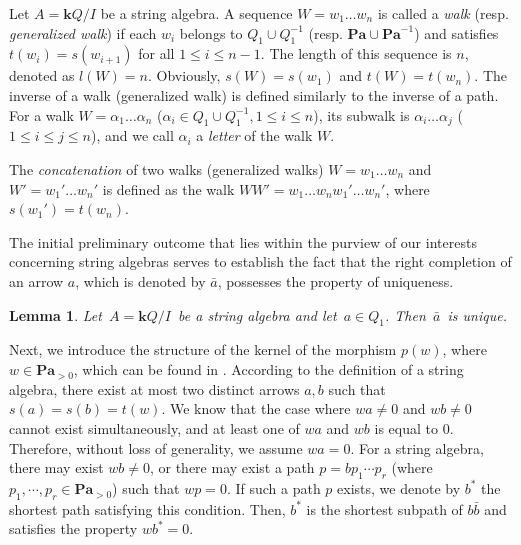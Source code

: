 \documentclass[11pt]{amsart}
\numberwithin{equation}{section}
\newtheorem{lemma}[theorem]{Lemma}
\theoremstyle{definition}
\begin{document}
Let $A = \mathbf{k}Q/I$ be a string algebra. 
A sequence \( W = w_1 \dots w_n \) is called a \emph{walk} (resp. \emph{generalized walk}) if each \( w_i \) belongs to \( Q_1 \cup Q_1^{-1} \) (resp. \( \textbf{Pa} \cup \textbf{Pa}^{-1} \)) and satisfies \( t(w_i) = s(w_{i + 1}) \) for all \( 1 \leq i \leq n-1 \).
The length of this sequence is \( n \), denoted as \( l(W) = n \). Obviously, \( s(W) = s(w_1) \) and \( t(W) = t(w_n) \). The inverse of a walk (generalized walk) is defined similarly to the inverse of a path. For a walk \( W = \alpha_1 \dots \alpha_n \) (\( \alpha_i \in Q_1 \cup Q_1^{-1}, 1 \leq i \leq n \)), its subwalk is \( \alpha_i \dots \alpha_j \) (\( 1 \leq i \leq j \leq n \)), and we call \( \alpha_i \) a \emph{letter} of the walk \( W \).

The \emph{concatenation} of two walks (generalized walks) \( W = w_1 \dots w_n \) and \( W' = w_1' \dots w_n' \) is defined as the walk \( WW' = w_1 \dots w_n w_1' \dots w_n' \), where \( s(w_1') = t(w_n) \).





The initial preliminary outcome that lies within the purview of our interests concerning string algebras serves to establish the fact that the right completion of an arrow $a$, which is denoted by \(\bar{a}\), possesses the property of uniqueness. 

\begin{lemma}\cite[Lemma 5]{FGR21}\label{lem:right-unique}
	Let \(A = \mathbf{k}Q/I\) be a string algebra and let \(a \in Q_1\). Then \(\bar{a}\) is unique.
\end{lemma}

Next, we introduce the structure of the kernel of the morphism \( p(w) \), where \( w \in \textbf{Pa}_{>0} \), which can be found in \cite{FGR21}.
According to the definition of a string algebra, there exist at most two distinct arrows \( a, b \) such that \( s(a) = s(b) = t(w) \). We know that the case where \( wa \neq 0 \) and \( wb \neq 0 \) cannot exist simultaneously, and at least one of \( wa \) and \( wb \) is equal to \( 0 \). Therefore, without loss of generality, we assume \( wa = 0 \). For a string algebra, there may exist \( wb \neq 0 \), or there may exist a path \( p = bp_1 \cdots p_r \) (where \( p_1, \cdots, p_r \in \textbf{Pa}_{>0} \)) such that \( wp = 0 \). If such a path \( p \) exists, we denote by \( b^* \) the shortest path satisfying this condition. Then, \( b^* \) is the shortest subpath of \( b\bar{b} \) and satisfies the property \( wb^* = 0 \).
\end{document}
